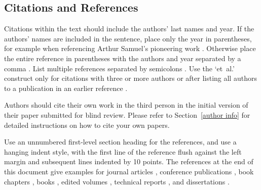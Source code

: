 \subsection{Citations and References}

Citations within the text should include the authors' last names and
year. If the authors' names are included in the sentence, place only
the year in parentheses, for example when referencing Arthur Samuel's
pioneering work . Otherwise place the entire
reference in parentheses with the authors and year separated by a
comma \cite{Samuel59}. List multiple references separated by
semicolons \cite{kearns89,Samuel59,mitchell80}. Use the `et~al.'
construct only for citations with three or more authors or after
listing all authors to a publication in an earlier reference \cite{MachineLearningI}.

Authors should cite their own work in the third person
in the initial version of their paper submitted for blind review.
Please refer to Section~\ref{author info} for detailed instructions on how to
cite your own papers.

Use an unnumbered first-level section heading for the references, and use a
hanging indent style, with the first line of the reference flush against the
left margin and subsequent lines indented by 10 points. The references at the
end of this document give examples for journal articles \cite{Samuel59},
conference publications \cite{langley00}, book chapters \cite{Newell81}, books
\cite{DudaHart2nd}, edited volumes \cite{MachineLearningI}, technical reports
\cite{mitchell80}, and dissertations \cite{kearns89}.


\nocite{langley00}
\fi

